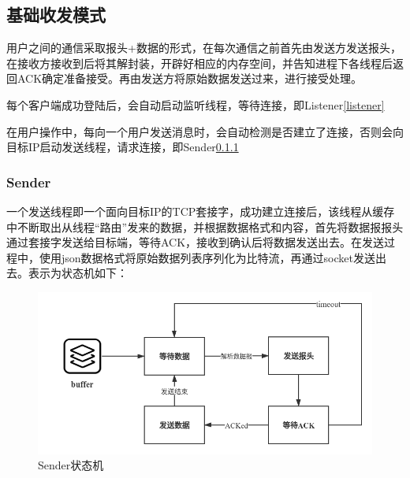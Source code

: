\documentclass[UTF8]{ctexart}
\begin{document}
\subsection{基础收发模式}

用户之间的通信采取报头+数据的形式，在每次通信之前首先由发送方发送报头，在接收方接收到后将其解封装，开辟好相应的内存空间，并告知进程下各线程后返回ACK确定准备接受。再由发送方将原始数据发送过来，进行接受处理。

每个客户端成功登陆后，会自动启动监听线程，等待连接，即Listener\ref{listener}

在用户操作中，每向一个用户发送消息时，会自动检测是否建立了连接，否则会向目标IP启动发送线程，请求连接，即Sender\ref{sender}

\subsubsection{Sender}\label{sender}
一个发送线程即一个面向目标IP的TCP套接字，成功建立连接后，该线程从缓存中不断取出从线程“路由”发来的数据，并根据数据格式和内容，首先将数据报报头通过套接字发送给目标端，等待ACK，接收到确认后将数据发送出去。在发送过程中，使用json数据格式将原始数据列表序列化为比特流，再通过socket发送出去。表示为状态机如下：
\begin{figure}[H]
    \centering
    \includegraphics[scale=0.4]{senderstate.png}
    \caption{Sender状态机}
\end{figure}
\end{document}
